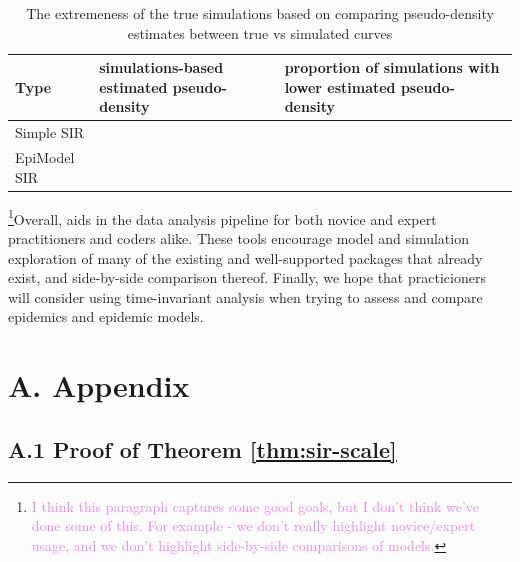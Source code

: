 \documentclass[
  shortnames]{jss}
\begin{document}
\begin{CodeChunk}
\begin{table}[!h]

\caption{\label{tab:hags-extreme}The extremeness of the true simulations based on comparing pseudo-density estimates between true vs simulated curves}
\centering
\begin{tabular}[t]{l>{\raggedleft\arraybackslash}p{6cm}>{\raggedleft\arraybackslash}p{6cm}}
\toprule
Type & simulations-based estimated pseudo-density & proportion of simulations with lower estimated pseudo-density\\
\midrule
Simple SIR & 0.0036733 & 0\\
EpiModel SIR & 0.0028813 & 0\\
\bottomrule
\end{tabular}
\end{table}

\end{CodeChunk}

\footnote{\textcolor{violet}{I think this paragraph captures some good goals, but I don't think we've done some of this. For example - we don't really highlight novice/expert usage, and we don't highlight side-by-side comparisons of models.}}Overall,
 aids in the data analysis pipeline for both novice and
expert practitioners and coders alike. These tools encourage model and
simulation exploration of many of the existing and well-supported
packages that already exist, and side-by-side comparison thereof.
Finally, we hope that practicioners will consider using time-invariant
analysis when trying to assess and compare epidemics and epidemic
models.

\hypertarget{a.-appendix}{%
\section*{A. Appendix}\label{a.-appendix}}

\hypertarget{a.1-proof-of-theorem}{%
\subsection*{\texorpdfstring{A.1 Proof of Theorem
\ref{thm:sir-scale}}{A.1 Proof of Theorem }}\label{a.1-proof-of-theorem}}
\end{document}

